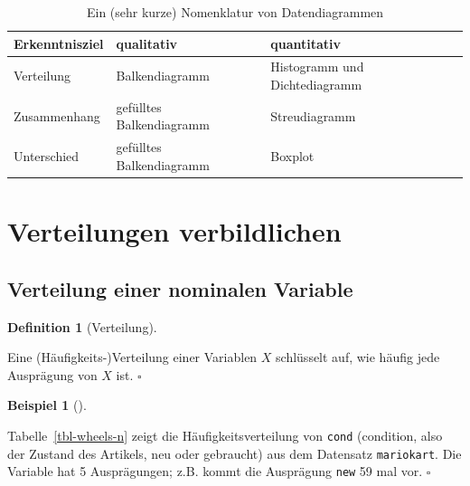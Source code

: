 \documentclass[
  letterpaper,
  twoside,
  open=any]{scrbook}
\theoremstyle{definition}
\newtheorem{definition}{Definition}[chapter]
\theoremstyle{definition}
\theoremstyle{definition}
\newtheorem{example}{Beispiel}[chapter]
\theoremstyle{remark}
\begin{document}
\begin{longtable}[]{@{}
  >{\raggedright\arraybackslash}p{}
  >{\raggedright\arraybackslash}p{}
  >{\raggedright\arraybackslash}p{}@{}}

\caption{\label{tbl-nom-plots}Ein (sehr kurze) Nomenklatur von
Datendiagrammen}

\tabularnewline

\toprule\noalign{}
\begin{minipage}[b]{\linewidth}\raggedright
Erkenntnisziel
\end{minipage} & \begin{minipage}[b]{\linewidth}\raggedright
qualitativ
\end{minipage} & \begin{minipage}[b]{\linewidth}\raggedright
quantitativ
\end{minipage} \\
\midrule\noalign{}
\endhead
\bottomrule\noalign{}
\endlastfoot
Verteilung & Balkendiagramm & Histogramm und Dichtediagramm \\
Zusammenhang & gefülltes Balkendiagramm & Streudiagramm \\
Unterschied & gefülltes Balkendiagramm & Boxplot \\

\end{longtable}

\section{Verteilungen verbildlichen}\label{verteilungen-verbildlichen}

\subsection{Verteilung einer nominalen
Variable}\label{verteilung-einer-nominalen-variable}

\begin{definition}[Verteilung]\protect\hypertarget{def-verteilung}{}\label{def-verteilung}

Eine (Häufigkeits-)Verteilung einer Variablen \(X\) schlüsselt auf, wie
häufig jede Ausprägung von \(X\) ist. \(\square\)

\end{definition}

\begin{example}[]\protect\hypertarget{exm-verteilung1}{}\label{exm-verteilung1}

Tabelle~\ref{tbl-wheels-n} zeigt die Häufigkeitsverteilung von
\texttt{cond} (condition, also der Zustand des Artikels, neu oder
gebraucht) aus dem Datensatz \texttt{mariokart}. Die Variable hat 5
Ausprägungen; z.B. kommt die Ausprägung \texttt{new} 59 mal vor.
\(\square\)

\end{example}
\end{document}
